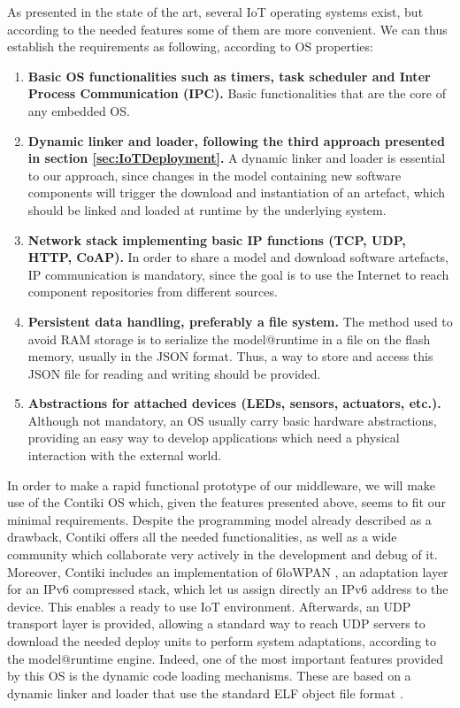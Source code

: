 As presented in the state of the art, several IoT operating systems exist, but according to the needed features some of them are more convenient.
We can thus establish the requirements as following, according to OS properties:
\begin{enumerate}
	\item \textbf{Basic OS functionalities such as timers, task scheduler and Inter Process Communication (IPC).} Basic functionalities that are the core of any embedded OS.
	\item \textbf{Dynamic linker and loader, following the third approach presented in section \ref{sec:IoTDeployment}.} A dynamic linker and loader is essential to our approach, since changes in the model containing new software components will trigger the download and instantiation of an artefact, which should be linked and loaded at runtime by the underlying system.
	\item \textbf{Network stack implementing basic IP functions (TCP, UDP, HTTP, CoAP).} In order to share a model and download software artefacts, IP communication is mandatory, since the goal is to use the Internet to reach component repositories from different sources.
	\item \textbf{Persistent data handling, preferably a file system.} The method used to avoid RAM storage is to serialize the model@runtime in a file on the flash memory, usually in the JSON format. Thus, a way to store and access this JSON file for reading and writing should be provided.
	\item \textbf{Abstractions for attached devices (LEDs, sensors, actuators, etc.).} Although not mandatory, an OS usually carry basic hardware abstractions, providing an easy way to develop applications which need a physical interaction with the external world.
\end{enumerate}
In order to make a rapid functional prototype of our middleware, we will make use of the Contiki OS which, given the features presented above, seems to fit our minimal requirements.
Despite the programming model already described as a drawback, Contiki offers all the needed functionalities, as well as a wide community which collaborate very actively in the development and debug of it.
Moreover, Contiki includes an implementation of 6loWPAN \cite{rfc4944}, an adaptation layer for an IPv6 compressed stack, which let us assign directly an IPv6 address to the device.
This enables a ready to use IoT environment.
Afterwards, an UDP transport layer is provided, allowing a standard way to reach UDP servers to download the needed deploy units to perform system adaptations, according to the model@runtime engine.
Indeed, one of the most important features provided by this OS is the dynamic code loading mechanisms.
These are based on a dynamic linker and loader that use the standard ELF object file format \cite{dunkels06runtime}.

